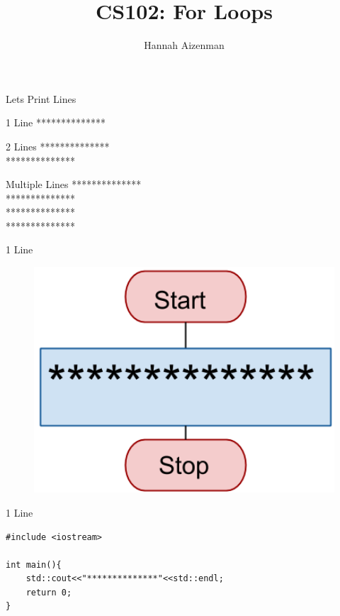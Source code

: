 \documentclass[xcolor={dvipsnames}]{beamer}
\begin{document}
\title{ CS102: For Loops }
\author{Hannah Aizenman}


\begin{frame}
	\titlepage
\end{frame}

\begin{frame}{Lets Print Lines}
\Large
\begin{block}{1 Line}
**************
\end{block}
\pause
\begin{block}{2 Lines}
**************\\
**************
\end{block}
\pause
\begin{block}{Multiple Lines}
**************\\
**************\\
**************\\
**************
\end{block}
\end{frame}

\begin{frame}{1 Line}
	\begin{figure}
		\includegraphics[width=1\textwidth]{one_line}
	\end{figure}
\end{frame}
%
\begin{frame}[fragile]{1 Line}
\Large
\begin{verbatim}
#include <iostream>

int main(){
    std::cout<<"**************"<<std::endl;
    return 0;
}
\end{verbatim}
\end{frame}
\end{document}
